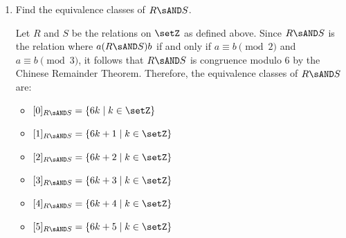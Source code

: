 \begin{enumerate}
\begin{enumerate}
\begin{subanswer}
\begin{itemize}
          \item $[2]_S = \{3k+2 \mid k \in \setZ\}$
        \end{itemize}
        The equivalence classes of $T$ are:
        \begin{itemize}
          \item $[0]_T = \{6k \mid k \in \setZ\}$
          \item $[1]_T = \{6k+1 \mid k \in \setZ\}$
          \item $[2]_T = \{6k+2 \mid k \in \setZ\}$
          \item $[3]_T = \{6k+3 \mid k \in \setZ\}$
          \item $[4]_T = \{6k+4 \mid k \in \setZ\}$
          \item $[5]_T = \{6k+5 \mid k \in \setZ\}$
        \end{itemize}
    \end{subanswer}
    \newpage
    \item Find the equivalence classes of $R \sAND S$.
      \begin{subanswer}
        Let $R$ and $S$ be the relations on $\setZ$ as defined above. 
        Since $R \sAND S$ is the relation where $a (R \sAND S) b$ if and only if $a \equiv b \pmod{2}$ and $a \equiv b \pmod{3}$, 
        it follows that $R \sAND S$ is congruence modulo $6$ by the Chinese Remainder Theorem. 
        Therefore, the equivalence classes of $R \sAND S$ are:
        \begin{itemize}
          \item $[0]_{R \sAND S} = \{6k \mid k \in \setZ\}$
          \item $[1]_{R \sAND S} = \{6k+1 \mid k \in \setZ\}$
          \item $[2]_{R \sAND S} = \{6k+2 \mid k \in \setZ\}$
          \item $[3]_{R \sAND S} = \{6k+3 \mid k \in \setZ\}$
          \item $[4]_{R \sAND S} = \{6k+4 \mid k \in \setZ\}$
          \item $[5]_{R \sAND S} = \{6k+5 \mid k \in \setZ\}$
        \end{itemize}
      \end{subanswer}



\end{enumerate}
\end{enumerate}
